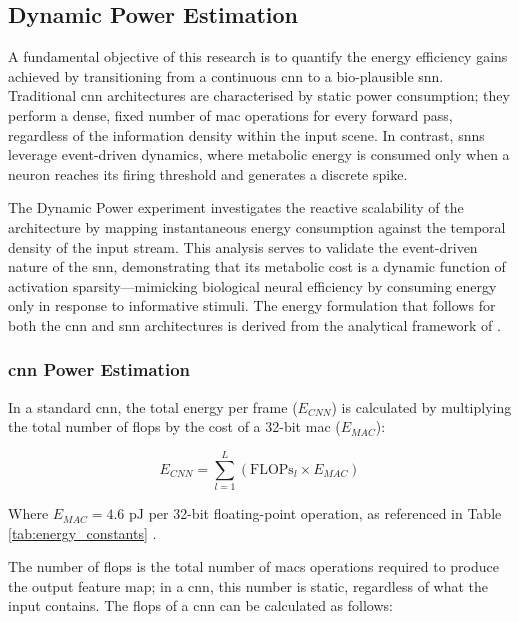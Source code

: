\subsection{Dynamic Power Estimation}
\label{subsec:dynamic_power}

A fundamental objective of this research is to quantify the energy efficiency gains achieved by transitioning from a continuous \gls{cnn} to a bio-plausible \gls{snn}.
Traditional \gls{cnn} architectures are characterised by static power consumption; they perform a dense, fixed number of \gls{mac} operations for every forward pass, regardless of the information density within the input scene. 
In contrast, \glspl{snn} leverage event-driven dynamics, where metabolic energy is consumed only when a neuron reaches its firing threshold and generates a discrete spike.

The Dynamic Power experiment investigates the reactive scalability of the architecture by mapping instantaneous energy consumption against the temporal density of the input stream. 
This analysis serves to validate the event-driven nature of the \gls{snn}, demonstrating that its metabolic cost is a dynamic function of activation sparsity---mimicking biological neural efficiency by consuming energy only in response to informative stimuli.
%
The energy formulation that follows for both the \gls{cnn} and \gls{snn} architectures is derived from the analytical framework of \textcite{lemaire2022analytical}.

\subsubsection{\gls{cnn} Power Estimation}

In a standard \gls{cnn}, the total energy per frame ($E_{CNN}$) is calculated by multiplying the total number of \glspl{flop} by the cost of a 32-bit \gls{mac} ($E_{MAC}$):

\begin{equation}
  E_{CNN} = \sum_{l=1}^{L} (\mathrm{FLOPs}_l \times E_{MAC})
\end{equation}

\noindent Where $E_{MAC} = 4.6\text{ pJ}$ per 32-bit floating-point operation, as referenced in Table \ref{tab:energy_constants} \cite{horowitz20141}.

The number of \glspl{flop} is the total number of \glspl{mac} operations required to produce the output feature map; in a \gls{cnn}, this number is static, regardless of what the input contains.
The \glspl{flop} of a \gls{cnn} can be calculated as follows:

